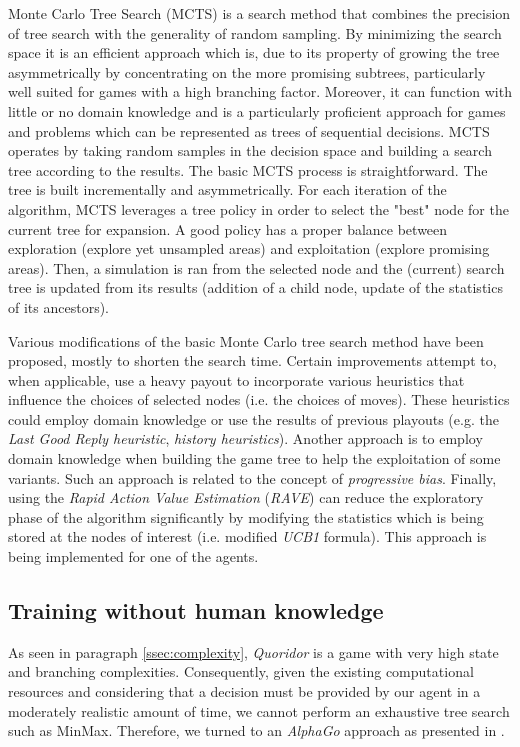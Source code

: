 \documentclass[journal, a4paper]{IEEEtran}
\begin{document}
Monte Carlo Tree Search (MCTS)\cite{mcts-review} is a search method that combines the precision of tree search with the generality of random sampling. By minimizing the search space it is an efficient approach which is, due to its property of growing the tree asymmetrically by concentrating on the more promising subtrees, particularly well suited for games with a high branching factor. Moreover, it can function with little or no domain knowledge and is a particularly proficient approach for games and problems which can be represented as trees of sequential decisions. MCTS operates by taking random samples in the decision space and building a search tree according to the results. The basic MCTS process is straightforward. The tree is built incrementally and asymmetrically. For each iteration of the algorithm, MCTS leverages a tree policy in order to select the "best" node for the current tree for expansion. A good policy has a proper balance between exploration (explore yet unsampled areas) and exploitation (explore promising areas). Then, a simulation is ran from the selected node and the (current) search tree is updated from its results (addition of a child node, update of the statistics of its ancestors). 

Various modifications of the basic Monte Carlo tree search method have been proposed, mostly to shorten the search time. Certain improvements attempt to, when applicable, use a heavy payout to incorporate various heuristics that influence the choices of selected nodes (i.e. the choices of moves). These heuristics could employ domain knowledge or use the results of previous playouts (e.g. the \textit{Last Good Reply heuristic}, \textit{history heuristics}). Another approach is to employ domain knowledge when building the game tree to help the exploitation of some variants. Such an approach is related to the concept of \textit{progressive bias}. Finally, using the \textit{Rapid Action Value Estimation} (\textit{RAVE}) can reduce the exploratory phase of the algorithm significantly by modifying the statistics which is being stored at the nodes of interest (i.e. modified \textit{UCB1} formula). This approach is being implemented for one of the agents. 

\subsection{Training without human knowledge}
\label{ssec:human-knowledge}

As seen in paragraph \ref{ssec:complexity}, \textit{Quoridor} is a game with very high state and branching complexities. Consequently, given the existing computational resources and considering that a decision must be provided by our agent in a moderately realistic amount of time, we cannot perform an exhaustive tree search such as MinMax. Therefore, we turned to an \textit{AlphaGo} approach as presented in \cite{alphago}.
\end{document}

